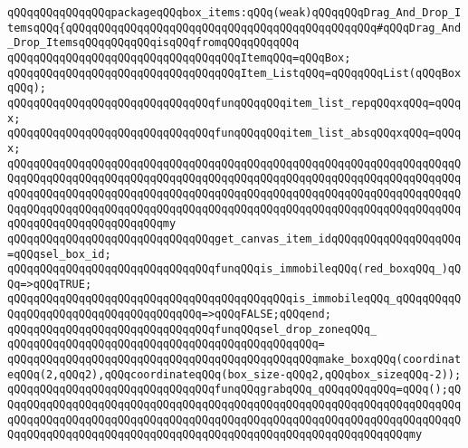 \verb|qQQqqQQqqQQqqQQqpackageqQQqbox_items:qQQq(weak)qQQqqQQqDrag_And_Drop_ItemsqQQq{qQQqqQQqqQQqqQQqqQQqqQQqqQQqqQQqqQQqqQQqqQQqqQQq#qQQqDrag_And_Drop_ItemsqQQqqQQqqQQqisqQQqfromqQQqqQQqqQQq|\newline
\newline
\verb|qQQqqQQqqQQqqQQqqQQqqQQqqQQqqQQqqQQqItemqQQq=qQQqBox;|\newline
\verb|qQQqqQQqqQQqqQQqqQQqqQQqqQQqqQQqqQQqItem_ListqQQq=qQQqqQQqList(qQQqBoxqQQq);|\newline
\newline
\verb|qQQqqQQqqQQqqQQqqQQqqQQqqQQqqQQqfunqQQqqQQqitem_list_repqQQqxqQQq=qQQqx;|\newline
\verb|qQQqqQQqqQQqqQQqqQQqqQQqqQQqqQQqfunqQQqqQQqitem_list_absqQQqxqQQq=qQQqx;|\newline
\newline
\verb|qQQqqQQqqQQqqQQqqQQqqQQqqQQqqQQqqQQqqQQqqQQqqQQqqQQqqQQqqQQqqQQqqQQqqQQqqQQqqQQqqQQqqQQqqQQqqQQqqQQqqQQqqQQqqQQqqQQqqQQqqQQqqQQqqQQqqQQqqQQqqQQqqQQqqQQqqQQqqQQqqQQqqQQqqQQqqQQqqQQqqQQqqQQqqQQqqQQqqQQqqQQqqQQqqQQqqQQqqQQqqQQqqQQqqQQqqQQqqQQqqQQqqQQqqQQqqQQqqQQqqQQqqQQqqQQqqQQqqQQqqQQqqQQqqQQqqQQqqQQqqQQqmy|\newline
\verb|qQQqqQQqqQQqqQQqqQQqqQQqqQQqqQQqget_canvas_item_idqQQqqQQqqQQqqQQqqQQq=qQQqsel_box_id;|\newline
\newline
\verb|qQQqqQQqqQQqqQQqqQQqqQQqqQQqqQQqfunqQQqis_immobileqQQq(red_boxqQQq_)qQQq=>qQQqTRUE;|\newline
\verb|qQQqqQQqqQQqqQQqqQQqqQQqqQQqqQQqqQQqqQQqqQQqis_immobileqQQq_qQQqqQQqqQQqqQQqqQQqqQQqqQQqqQQqqQQqqQQq=>qQQqFALSE;qQQqend;|\newline
\newline
\verb|qQQqqQQqqQQqqQQqqQQqqQQqqQQqqQQqfunqQQqsel_drop_zoneqQQq_|\newline
\verb|qQQqqQQqqQQqqQQqqQQqqQQqqQQqqQQqqQQqqQQqqQQqqQQq=|\newline
\verb|qQQqqQQqqQQqqQQqqQQqqQQqqQQqqQQqqQQqqQQqqQQqqQQqmake_boxqQQq(coordinateqQQq(2,qQQq2),qQQqcoordinateqQQq(box_size-qQQq2,qQQqbox_sizeqQQq-2));|\newline
\newline
\verb|qQQqqQQqqQQqqQQqqQQqqQQqqQQqqQQqfunqQQqgrabqQQq_qQQqqQQqqQQq=qQQq();qQQqqQQqqQQqqQQqqQQqqQQqqQQqqQQqqQQqqQQqqQQqqQQqqQQqqQQqqQQqqQQqqQQqqQQqqQQqqQQqqQQqqQQqqQQqqQQqqQQqqQQqqQQqqQQqqQQqqQQqqQQqqQQqqQQqqQQqqQQqqQQqqQQqqQQqqQQqqQQqqQQqqQQqqQQqqQQqqQQqqQQqqQQqqQQqqQQqqQQqqQQqmy|\newline
